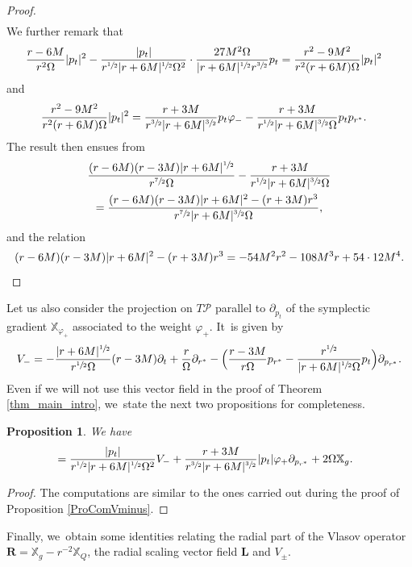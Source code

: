 \documentclass[10pt]{amsart}
\theoremstyle{plain}
\newtheorem{proposition}{Proposition}[section]
\theoremstyle{definition}
\newcommand\T{{\mathbb{X}}}
\begin{document}
\begin{proof}
\begin{align*}
\end{align*}
We further remark that
\begin{align*}
\frac{r-6M}{r^2 \Omega} |p_t|^2 -\frac{|p_t|}{r^{\sfrac{1}{2}}|r+6M|^{\sfrac{1}{2}}\Omega^2}\cdot \frac{27M^2 \Omega}{|r+6M|^{\sfrac{1}{2}}r^{\sfrac{3}{2}}}p_t &= \frac{r^2-9M^2}{r^2(r+6M) \Omega} |p_t|^2
\end{align*}
and
\begin{align*}
\frac{r^2-9M^2}{r^2(r+6M) \Omega} |p_t|^2 &=\frac{r+3M}{r^{\sfrac{3}{2}}|r+6M|^{\sfrac{3}{2}} } p_t \varphi_-- \frac{r+3M}{r^{\sfrac{1}{2}}|r+6M|^{\sfrac{3}{2}} \Omega } p_t p_{r^*}.
\end{align*}
The result then ensues from
\begin{multline*}
\frac{(r-6M)(r-3M)|r+6M|^{\sfrac{1}{2}}}{r^{\sfrac{7}{2}} \Omega }- \frac{r+3M}{r^{\sfrac{1}{2}}|r+6M|^{\sfrac{3}{2}} \Omega } \\
=\frac{(r-6M)(r-3M)|r+6M|^2-(r+3M)r^3}{r^{\sfrac{7}{2}} |r+6M|^{\sfrac{3}{2}} \Omega},
\end{multline*}
and the relation
\[
(r-6M)(r-3M)|r+6M|^2-(r+3M)r^3=-54M^2r^2-108M^3r+54 \cdot 12 M^4.\qedhere
\]
\end{proof}

Let us also consider the projection on $T \mathcal{P}$ parallel to $\partial_{p_t}$ of the symplectic gradient $\T_{\varphi_+}$ associated to the weight $\varphi_+$. It~is given by
\[
V_- =- \frac{|r+6M|^{\sfrac{1}{2}}}{r^{\sfrac{1}{2}}\Omega}(r-3M) \partial_t+\frac{r}{\Omega} \partial_{r^*}-\Bigl(\frac{r-3M}{r\Omega}p_{r^*}-\frac{r^{\sfrac{1}{2}}}{|r+6M|^{\sfrac{1}{2}} \Omega}p_t \Bigr) \partial_{p_{r^*}}.
\]
Even if we will not use this vector field in the proof of Theorem \ref{thm_main_intro}, we~state the next two propositions for completeness.

\begin{proposition}\label{ProVplus}
We have
\begin{align*}
[\T_g,V_-] &= \frac{|p_t|}{r^{\sfrac{1}{2}}|r+6M|^{\sfrac{1}{2}}\Omega^2} V_-+ \frac{r+3M}{r^{\sfrac{3}{2}}|r+6M|^{\sfrac{3}{2}}}|p_t|\varphi_+ \partial_{p_{r^*}} + 2\Omega \T_g.
\end{align*}
\end{proposition}
\begin{proof}
The computations are similar to the ones carried out during the proof of Proposition \ref{ProComVminus}.
\end{proof}
Finally, we~obtain some identities relating the radial part of the Vlasov operator $\pmb{R}=\T_g-r^{-2}\T_Q$, the radial scaling vector field $\pmb{L}$ and $V_{\pm}$.
\end{document}
